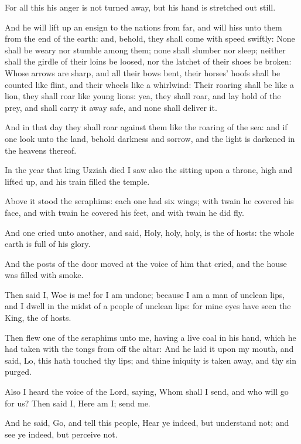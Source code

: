 For all this his anger is not turned away, but his hand is stretched out still.

\Verse And he will lift up an ensign to the nations from far, and will hiss unto them from the end of the earth: and, behold, they shall come with speed swiftly: \Verse None shall be weary nor stumble among them; none shall slumber nor sleep; neither shall the girdle of their loins be loosed, nor the latchet of their shoes be broken: \Verse Whose arrows are sharp, and all their bows bent, their horses' hoofs shall be counted like flint, and their wheels like a whirlwind: \Verse Their roaring shall be like a lion, they shall roar like young lions: yea, they shall roar, and lay hold of the prey, and shall carry it away safe, and none shall deliver it.

\Verse And in that day they shall roar against them like the roaring of the sea: and if one look unto the land, behold darkness and sorrow, and the light is darkened in the heavens thereof.


\Chapter
\Verse In the year that king Uzziah died I saw also the \LORD sitting upon a throne, high and lifted up, and his train filled the temple.

\Verse Above it stood the seraphims: each one had six wings; with twain he covered his face, and with twain he covered his feet, and with twain he did fly.

\Verse And one cried unto another, and said, Holy, holy, holy, is the \LORD of hosts: the whole earth is full of his glory.

\Verse And the posts of the door moved at the voice of him that cried, and the house was filled with smoke.

\Verse Then said I, Woe is me! for I am undone; because I am a man of unclean lips, and I dwell in the midst of a people of unclean lips: for mine eyes have seen the King, the \LORD of hosts.

\Verse Then flew one of the seraphims unto me, having a live coal in his hand, which he had taken with the tongs from off the altar: \Verse And he laid it upon my mouth, and said, Lo, this hath touched thy lips; and thine iniquity is taken away, and thy sin purged.

\Verse Also I heard the voice of the Lord, saying, Whom shall I send, and who will go for us? Then said I, Here am I; send me.

\Verse And he said, Go, and tell this people, Hear ye indeed, but understand not; and see ye indeed, but perceive not.

